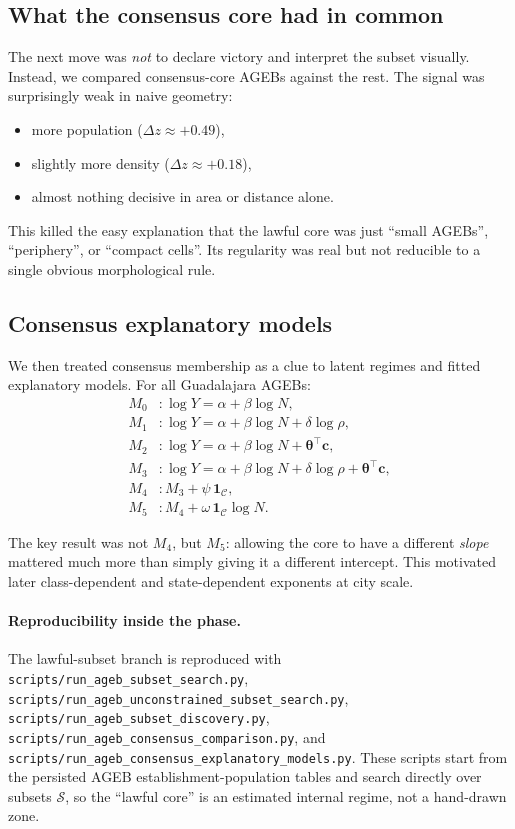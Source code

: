 \documentclass[11pt]{article}
\begin{document}
\subsection{What the consensus core had in common}

The next move was \emph{not} to declare victory and interpret the subset visually. Instead, we compared consensus-core AGEBs against the rest. The signal was surprisingly weak in naive geometry:
\begin{itemize}
\item more population (\(\Delta z \approx +0.49\)),
\item slightly more density (\(\Delta z \approx +0.18\)),
\item almost nothing decisive in area or distance alone.
\end{itemize}

This killed the easy explanation that the lawful core was just ``small AGEBs'', ``periphery'', or ``compact cells''. Its regularity was real but not reducible to a single obvious morphological rule.

\subsection{Consensus explanatory models}

We then treated consensus membership as a clue to latent regimes and fitted explanatory models. For all Guadalajara AGEBs:
\begin{align}
M_0 &: \log Y = \alpha + \beta \log N,\\
M_1 &: \log Y = \alpha + \beta \log N + \delta \log \rho,\\
M_2 &: \log Y = \alpha + \beta \log N + \bm{\theta}^\top \mathbf{c},\\
M_3 &: \log Y = \alpha + \beta \log N + \delta \log \rho + \bm{\theta}^\top \mathbf{c},\\
M_4 &: M_3 + \psi\, \mathbf{1}_{\mathcal{C}},\\
M_5 &: M_4 + \omega\, \mathbf{1}_{\mathcal{C}}\log N.
\end{align}

The key result was not \(M_4\), but \(M_5\): allowing the core to have a different \emph{slope} mattered much more than simply giving it a different intercept. This motivated later class-dependent and state-dependent exponents at city scale.

\paragraph{Reproducibility inside the phase.}
The lawful-subset branch is reproduced with
\texttt{scripts/run\_ageb\_subset\_search.py},
\texttt{scripts/run\_ageb\_unconstrained\_subset\_search.py},
\texttt{scripts/run\_ageb\_subset\_discovery.py},
\texttt{scripts/run\_ageb\_consensus\_comparison.py},
and
\texttt{scripts/run\_ageb\_consensus\_explanatory\_models.py}.
These scripts start from the persisted AGEB establishment-population tables and search directly over subsets \(\mathcal{S}\), so the ``lawful core'' is an estimated internal regime, not a hand-drawn zone.
\end{document}
